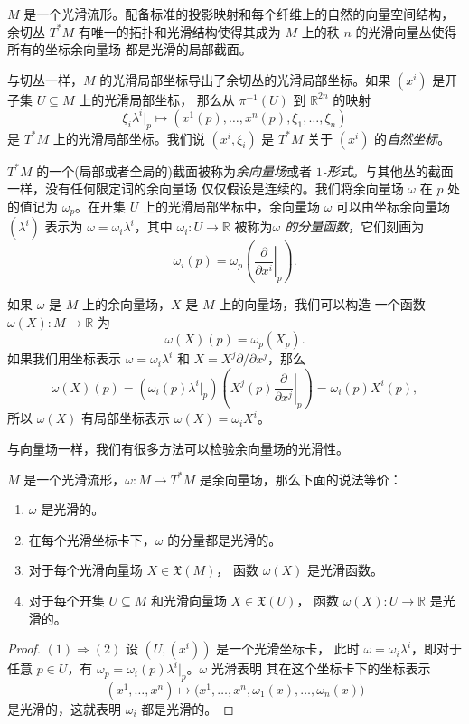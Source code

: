 \begin{proposition}[余切丛作为向量丛]
  $M$ 是一个光滑流形。配备标准的投影映射和每个纤维上的自然的向量空间结构，
  余切丛 $T^*M$ 有唯一的拓扑和光滑结构使得其成为 $M$ 
  上的秩 $n$ 的光滑向量丛使得所有的坐标余向量场
  都是光滑的局部截面。
\end{proposition}

与切丛一样，$M$ 的光滑局部坐标导出了余切丛的光滑局部坐标。如果 
$\left(x^i\right)$ 是开子集 $U\subseteq M$ 上的光滑局部坐标，
那么从 $\pi^{-1}(U)$ 到 $\mathbb{R}^{2n}$ 的映射
\[
  \xi_i\lambda^i|_p \mapsto 
  \left(x^1(p),\dots,x^n(p),\xi_1,\dots,\xi_n\right)
\]
是 $T^*M$ 上的光滑局部坐标。我们说 $\left(x^i,\xi_i\right)$ 是
$T^*M$ 关于 $\left(x^i\right)$ 的\emph{自然坐标}。

$T^*M$ 的一个(局部或者全局的)截面被称为\emph{余向量场}或者
\emph{$1$-形式}。与其他丛的截面一样，没有任何限定词的余向量场
仅仅假设是连续的。我们将余向量场 $\omega$ 在 $p$ 处的值记为
$\omega_p$。在开集 $U$ 上的光滑局部坐标中，余向量场 $\omega$
可以由坐标余向量场 $\left(\lambda^i\right)$ 表示为
$\omega=\omega_i\lambda^i$，其中 $\omega_i:U\to \mathbb{R}$
被称为\emph{$\omega$ 的分量函数}，它们刻画为
\[
  \omega_i(p)=\omega_p\left(\left.\frac{\partial}{\partial x^i}\right|_p\right).  
\]

如果 $\omega$ 是 $M$ 上的余向量场，$X$ 是 $M$ 上的向量场，我们可以构造
一个函数 $\omega(X):M\to \mathbb{R}$ 为
\[
  \omega(X)(p)=\omega_p(X_p).  
\]
如果我们用坐标表示 $\omega=\omega_i\lambda^i$ 和 $X=X^j\partial/\partial x^j$，那么
\[
  \omega(X)(p)=\left(\omega_i(p)\lambda^i|_p\right) 
  \left(X^j(p)\left.\frac{\partial}{\partial x^j}\right|_p\right)
  =\omega_i(p)X^i(p),
\]
所以 $\omega(X)$ 有局部坐标表示 $\omega(X)=\omega_iX^i$。

与向量场一样，我们有很多方法可以检验余向量场的光滑性。

\begin{proposition}[余向量场的光滑性判别]
  $M$ 是一个光滑流形，$\omega:M\to T^*M$ 是余向量场，那么下面的说法等价：
  \begin{enumerate}
    \item $\omega$ 是光滑的。
    \item 在每个光滑坐标卡下，$\omega$ 的分量都是光滑的。
    \item 对于每个光滑向量场 $X\in \mathfrak{X}(M)$，
    函数 $\omega(X)$ 是光滑函数。
    \item 对于每个开集 $U\subseteq M$ 和光滑向量场 $X\in \mathfrak{X}(U)$，
    函数 $\omega(X):U\to \mathbb{R}$ 是光滑的。
  \end{enumerate}
\end{proposition}
\begin{proof}
  $(1)\Rightarrow (2)$ 设 $(U,(x^i))$ 是一个光滑坐标卡，
  此时 $\omega=\omega_i\lambda^i$，即对于任意 $p\in U$，有
  $\omega_p=\omega_i(p)\lambda^i|_p$。$\omega$ 光滑表明
  其在这个坐标卡下的坐标表示
  \[
    (x^1,\dots,x^n)\mapsto \bigl(x^1,\dots,x^n,\omega_1(x),\dots,\omega_n(x)\bigr)
  \]
  是光滑的，这就表明 $\omega_i$ 都是光滑的。
\end{proof}

